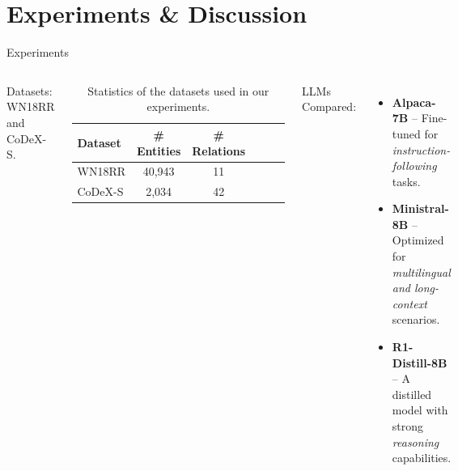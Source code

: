 \documentclass[aspectratio=169,xcolor=dvipsnames]{beamer}
\newcommand{\modelministral}{Ministral-8B\xspace}
\newcommand{\modelalpaca}{Alpaca-7B\xspace}
\newcommand{\modeldeepseek}{R1-Distill-8B\xspace}
\begin{document}
\section{Experiments \& Discussion}
\begin{frame}{Experiments}
    \begin{columns}[c]
        Datasets: WN18RR and CoDeX-S.
        \begin{table}[h]
            \centering
            \begin{tabular}{l c c c c c}
                \toprule
                \textbf{Dataset} & \textbf{\# Entities} & \textbf{\# Relations} \\
                \midrule
                WN18RR           & 40,943               & 11                    \\
                CoDeX-S          & 2,034                & 42                    \\
                \bottomrule
            \end{tabular}
            \caption{Statistics of the datasets used in our experiments.}
            \label{tab:datasets}
        \end{table}

        LLMs Compared:
        \begin{itemize}
            \item \textbf{\modelalpaca} – Fine-tuned for \textit{instruction-following} tasks.
            \item \textbf{\modelministral} – Optimized for \textit{multilingual and long-context} scenarios.
            \item \textbf{\modeldeepseek} – A distilled model with strong \textit{reasoning} capabilities.
        \end{itemize}
    \end{columns}
\end{frame}
\end{document}
